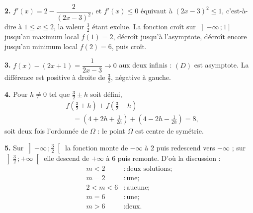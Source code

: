 \begin{corrige}
\textbf{2.} $f'(x) = 2-\dfrac{2}{(2x-3)^{2}}$, et $f'(x)\leq0$ équivaut à
$(2x-3)^{2}\leq1$, c'est-à-dire à $1 \leq x \leq 2$, la valeur $\frac32$ étant
exclue. La fonction croît sur $\left]-\infty\,;1\right]$ jusqu'au maximum
local $f(1) = 2$, décroît jusqu'à l'asymptote, décroît encore jusqu'au minimum
local $f(2) = 6$, puis croît.

\textbf{3.} $f(x)-(2x+1) = \dfrac{1}{2x-3}\to0$ aux deux infinis : $(D)$ est
asymptote. La différence est positive à droite de $\frac32$, négative à
gauche.

\textbf{4.} Pour $h \neq 0$ tel que $\frac32\pm h$ soit défini,
\[\begin{aligned}
&f\!\left(\tfrac32+h\right)+f\!\left(\tfrac32-h\right)\\
  &\quad = \left(4+2h+\frac{1}{2h}\right)+\left(4-2h-\frac{1}{2h}\right) = 8,
\end{aligned}\]
soit deux fois l'ordonnée de $\Omega$ : le point $\Omega$ est centre de
symétrie.

\textbf{5.} Sur $\left]-\infty\,;\frac32\right[$ la fonction monte de
$-\infty$ à $2$ puis redescend vers $-\infty$ ; sur
$\left]\frac32\,;+\infty\right[$ elle descend de $+\infty$ à $6$ puis remonte.
D'où la discussion :
\[\begin{aligned}
m<2 &: \text{deux solutions} ; \\
  m=2 &: \text{une} ; \\
  2<m<6 &: \text{aucune} ; \\
  m=6 &: \text{une} ; \\
  m>6 &: \text{deux.}
\end{aligned}\]
\end{corrige}
